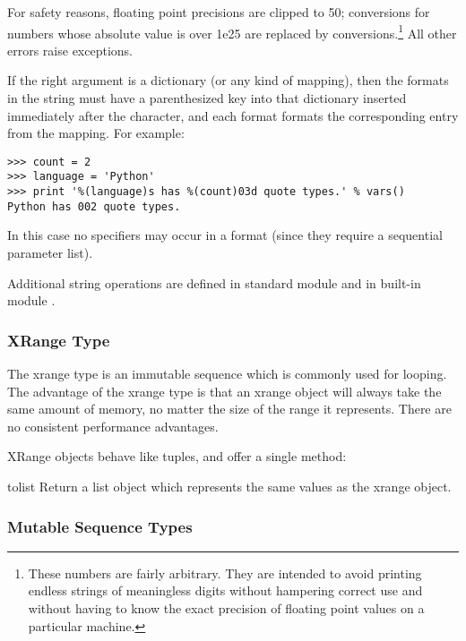 For safety reasons, floating point precisions are clipped to 50;
 conversions for numbers whose absolute value is over 1e25
are replaced by  conversions.\footnote{
  These numbers are fairly arbitrary.  They are intended to
  avoid printing endless strings of meaningless digits without hampering
  correct use and without having to know the exact precision of floating
  point values on a particular machine.
}  All other errors raise exceptions.

If the right argument is a dictionary (or any kind of mapping), then
the formats in the string must have a parenthesized key into that
dictionary inserted immediately after the \character{\%} character,
and each format formats the corresponding entry from the mapping.
For example:

\begin{verbatim}
>>> count = 2
>>> language = 'Python'
>>> print '%(language)s has %(count)03d quote types.' % vars()
Python has 002 quote types.
\end{verbatim}

In this case no \code{*} specifiers may occur in a format (since they
require a sequential parameter list).

Additional string operations are defined in standard module
 and in built-in module .


\subsubsection{XRange Type \label{typesseq-xrange}}

The xrange type is an immutable sequence which is
commonly used for looping.  The advantage of the xrange type is that an
xrange object will always take the same amount of memory, no matter the
size of the range it represents.  There are no consistent performance
advantages.

XRange objects behave like tuples, and offer a single method:

\begin{methoddesc}[xrange]{tolist}{}
  Return a list object which represents the same values as the xrange
  object.
\end{methoddesc}


\subsubsection{Mutable Sequence Types \label{typesseq-mutable}}

